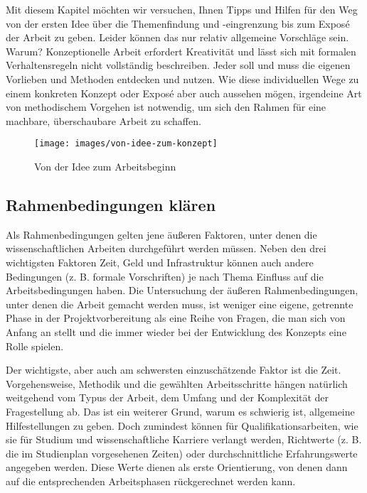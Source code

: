 \documentclass[]{article}
\begin{document}
Mit diesem Kapitel möchten wir versuchen, Ihnen Tipps und Hilfen für den
Weg von der ersten Idee über die Themenfindung und -eingrenzung bis zum
Exposé der Arbeit zu geben. Leider können das nur relativ allgemeine
Vorschläge sein. Warum? Konzeptionelle Arbeit erfordert Kreativität und
lässt sich mit formalen Verhaltensregeln nicht vollständig beschreiben.
Jeder soll und muss die eigenen Vorlieben und Methoden entdecken und
nutzen. Wie diese individuellen Wege zu einem konkreten Konzept oder
Exposé aber auch aussehen mögen, irgendeine Art von methodischem
Vorgehen ist notwendig, um sich den Rahmen für eine machbare,
überschaubare Arbeit zu schaffen.

\begin{figure}

{\centering \texttt{[image: images/von-idee-zum-konzept]} 

}

\caption{Von der Idee zum Arbeitsbeginn}\label{fig:unnamed-chunk-3}
\end{figure}

\subsection{Rahmenbedingungen klären}\label{rahmenbedingungen-klaren}

Als Rahmenbedingungen gelten jene äußeren Faktoren, unter denen die
wissenschaftlichen Arbeiten durchgeführt werden müssen. Neben den drei
wichtigsten Faktoren Zeit, Geld und Infrastruktur können auch andere
Bedingungen (z. B. formale Vorschriften) je nach Thema Einfluss auf die
Arbeitsbedingungen haben. Die Untersuchung der äußeren
Rahmenbedingungen, unter denen die Arbeit gemacht werden muss, ist
weniger eine eigene, getrennte Phase in der Projektvorbereitung als eine
Reihe von Fragen, die man sich von Anfang an stellt und die immer wieder
bei der Entwicklung des Konzepts eine Rolle spielen.

Der wichtigste, aber auch am schwersten einzuschätzende Faktor ist die
Zeit. Vorgehensweise, Methodik und die gewählten Arbeitsschritte hängen
natürlich weitgehend vom Typus der Arbeit, dem Umfang und der
Komplexität der Fragestellung ab. Das ist ein weiterer Grund, warum es
schwierig ist, allgemeine Hilfestellungen zu geben. Doch zumindest
können für Qualifikationsarbeiten, wie sie für Studium und
wissenschaftliche Karriere verlangt werden, Richtwerte (z. B. die im
Studienplan vorgesehenen Zeiten) oder durchschnittliche Erfahrungswerte
angegeben werden. Diese Werte dienen als erste Orientierung, von denen
dann auf die entsprechenden Arbeitsphasen rückgerechnet werden kann.
\end{document}
